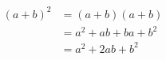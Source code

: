 \documentclass[12pt]{article}
\begin{document}
\begin{equation}
	\begin{split}
		(a+b)^2  &  =  (a+b)(a+b)\\
		&  =  a^2+ab+ba+b^2\\
		&  =  a^2+2ab+b^2
	\end{split}
\end{equation}
\end{document}
